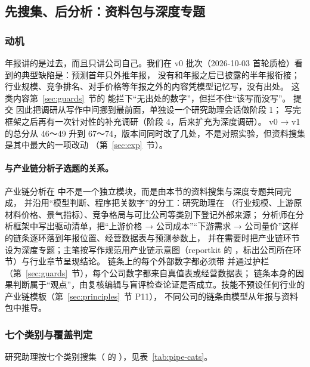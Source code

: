 \subsection{先搜集、后分析：资料包与深度专题}
\label{sec:pipe-research}

\subsubsection{动机}

年报讲的是过去，而且只讲公司自己。我们在 v0 批次（2026-10-03 首轮质检）看到的典型缺陷是：预测首年只外推年报，
没有和年报之后已披露的半年报衔接；行业规模、竞争排名、对手价格等年报之外的内容凭模型记忆写，没有出处。
这类内容第~\ref{sec:guards}~节的  能拦下“无出处的数字”，但拦不住“该写而没写”。
提交  因此把调研从写作中间挪到最前面，单独设一个研究助理会话做阶段 1；
写完框架之后再有一次针对性的补充调研（阶段 4，后来扩充为深度调研）。
v0 → v1 的总分从 46～49 升到 67～74，版本间同时改了几处，不是对照实验，但资料搜集是其中最大的一项改动
（第~\ref{sec:exp}~节）。

\paragraph{与产业链分析子选题的关系。}产业链分析在 \sysname{} 中不是一个独立模块，而是由本节的资料搜集与深度专题共同完成，
并沿用“模型判断、程序把关数字”的分工：研究助理在 （行业规模、上游原材料价格、景气指标）、竞争格局与可比公司等类别下登记外部来源；
分析师在分析框架中写出驱动清单，把“上游价格 → 公司成本”“下游需求 → 公司量价”这样的链条逐环落到年报位置、经营数据表与预测参数上，
并在需要时把产业链环节设为深度专题；主笔按写作规范用产业链示意图（reportkit 的 ，标出公司所在环节）与行业章节呈现结论。
链条上的每个外部数字都必须带 \code{[S编号]} 并通过护栏（第~\ref{sec:guards}~节），每个公司数字都来自真值表或经营数据表；
链条本身的因果判断属于“观点”，由复核编辑与盲评检查论证是否成立。技能不预设任何行业的产业链模板（第~\ref{sec:principles}~节 P11），
不同公司的链条由模型从年报与资料包中推导。

\subsubsection{七个类别与覆盖判定}

研究助理按七个类别搜集（ 的 ），见表~\ref{tab:pipe-cats}。

